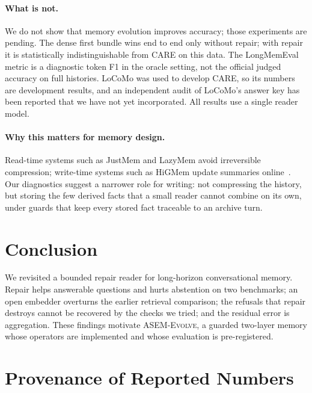 \documentclass[11pt]{article}
\newcommand{\care}{\textsc{CARE}}
\newcommand{\evolve}{\textsc{ASEM-Evolve}}
\begin{document}
\paragraph{What is not.}
We do not show that memory evolution improves accuracy; those experiments are
pending. The dense first bundle wins end to end only without repair; with repair
it is statistically indistinguishable from \care{} on this data. The
LongMemEval metric is a diagnostic token F1 in the oracle setting, not the
official judged accuracy on full histories. LoCoMo was used to develop \care{},
so its numbers are development results, and an independent audit of LoCoMo's
answer key has been reported that we have not yet incorporated. All results use
a single reader model.

\paragraph{Why this matters for memory design.}
Read-time systems such as JustMem and LazyMem avoid irreversible compression;
write-time systems such as HiGMem update summaries online~\cite{chen2026justmem,yu2026lazymem,cao2026higmem}.
Our diagnostics suggest a narrower role for writing: not compressing the
history, but storing the few derived facts that a small reader cannot combine
on its own, under guards that keep every stored fact traceable to an archive
turn.

\section{Conclusion}
\label{sec:conclusion}

We revisited a bounded repair reader for long-horizon conversational memory.
Repair helps answerable questions and hurts abstention on two benchmarks; an
open embedder overturns the earlier retrieval comparison; the refusals that
repair destroys cannot be recovered by the checks we tried; and the residual
error is aggregation. These findings motivate \evolve{}, a guarded two-layer
memory whose operators are implemented and whose evaluation is pre-registered.




\appendix
\section{Provenance of Reported Numbers}
\label{app:provenance}
\end{document}
